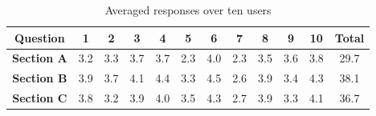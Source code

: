 \documentclass[12pt]{article}
\begin{document}
\begin{table}
\centering
\begin{tabular}{ |c|c|c|c|c|c|c|c|c|c|c|c| } 
 \hline
 \textbf{Question} & \textbf{1} & \textbf{2} & \textbf{3} & \textbf{4} & \textbf{5} & \textbf{6} & \textbf{7} & \textbf{8} & \textbf{9} & \textbf{10} & \textbf{Total} \\ 
 \hline
 \textbf{Section A} & 3.2 & 3.3 & 3.7 & 3.7 & 2.3 & 4.0 & 2.3 & 3.5 & 3.6 & 3.8 & 29.7\\ 
 
 \textbf{Section B} & 3.9 & 3.7 & 4.1 & 4.4 & 3.3 & 4.5 & 2.6 & 3.9 & 3.4 & 4.3 & 38.1\\ 
 
 \textbf{Section C} & 3.8 & 3.2 & 3.9 & 4.0 & 3.5 & 4.3 & 2.7 & 3.9 & 3.3 & 4.1 & 36.7\\ 
 \hline
\end{tabular}
\caption{Averaged responses over ten users}
\end{table}
\end{document}
